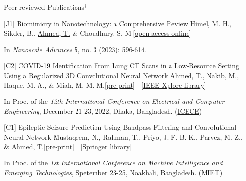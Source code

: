 \documentclass{resume} %
\begin{document}
\begin{rSection}{Peer-reviewed Publications$^\dagger$}
\begin{rPublicationSubsection}{[J1] Biomimicry in Nanotechnology: a Comprehensive Review}{}
{Himel, M. H., Sikder, B., \underline{Ahmed, T.} \& Choudhury, S. M.}{\href{https://pubs.rsc.org/en/content/articlehtml/2023/na/d2na00571a}{[open access online]}}
\item In \textit{Nanoscale Advances} 5, no. 3 (2023): 596-614. 
\end{rPublicationSubsection}

\begin{rPublicationSubsection}{[C2] COVID-19 Identification From Lung CT Scans in a Low-Resource Setting Using a Regularized 3D Convolutional Neural Network}{}
{\underline{Ahmed, T.}, Nakib, M., Haque, M. A., \& Miah, M. M. M.}{\href{https://drive.google.com/file/d/1Fki37ltfIkXam9g6lj242uVDxp1D_IR7/view?usp=sharing}{[pre-print]} 
$\mid$  
\href{https://ieeexplore.ieee.org/abstract/document/10089141}{[IEEE Xplore library]}}
\item In Proc. of the \textit{12th International Conference on Electrical and Computer Engineering}, December 21-23, 2022, Dhaka, Bangladesh. (\href{https://icece.buet.ac.bd/index.html}{ICECE}) 
\end{rPublicationSubsection}

\begin{rPublicationSubsection}{[C1] Epileptic Seizure Prediction Using Bandpass Filtering and Convolutional Neural Network}{}
{Mustaqeem, N., Rahman, T., Priyo, J. F. B. K., Parvez, M. Z., \& \underline{Ahmed, T.}}{\href{https://drive.google.com/file/d/1pILYdvZ1NUCmcywPhohDhJTajH0TKZtl/view?usp=sharing}{[pre-print]} 
$\mid$ 
\href{https://link.springer.com/chapter/10.1007/978-3-031-34622-4_2}{[Springer library]}}
\item In Proc. of the \textit{1st International Conference on Machine Intelligence and Emerging Technologies}, Spetember 23-25, Noakhali, Bangladesh. (\href{https://confmiet.org/}{MIET})

\end{rPublicationSubsection}



\end{rSection}
\end{document}
